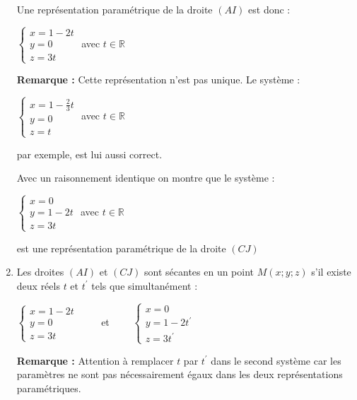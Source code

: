 \begin{corrige}
\begin{enumerate}
          \par
          Une représentation paramétrique de la droite $\left(AI\right)$ est donc :
          \begin{center}$\left\{ \begin{matrix} x=1-2t \\ y=0 \\ z=3t \end{matrix}\right.      $  avec $t \in  \mathbb{R}$\end{center}
               \textbf{Remarque : }Cette représentation n'est pas unique. Le système :
               \begin{center}$\left\{ \begin{matrix} x=1-\frac{2}{3}t \\ y=0 \\ z=t \end{matrix}\right.      $  avec $t \in  \mathbb{R}$\end{center}
                    par exemple, est lui aussi correct.
                    \par
                    Avec un raisonnement identique on montre que le système :
                    \begin{center}$\left\{ \begin{matrix} x=0 \\ y=1-2t \\ z=3t \end{matrix}\right.      $  avec $t \in  \mathbb{R}$\end{center}
                         est une représentation paramétrique de la droite $\left(CJ\right)$
                         \item
                         Les droites $\left(AI\right)$ et $\left(CJ\right)$ sont sécantes en un point $M\left(x ; y ; z\right)$ s'il existe deux réels $t$ et $t^{\prime}$ tels que simultanément :
                         \begin{center}$\left\{ \begin{matrix} x=1-2t \\ y=0 \\ z=3t \end{matrix}\right.  \qquad    $ et $    \qquad      \left\{ \begin{matrix} x=0 \\ y=1-2t^{\prime} \\ z=3t^{\prime} \end{matrix}\right.      $  \end{center}
                                   \textbf{Remarque :} Attention à remplacer $t$ par $t^{\prime}$ dans le second système car les paramètres ne sont pas nécessairement égaux dans les deux représentations paramétriques.

\end{enumerate}
\end{corrige}
